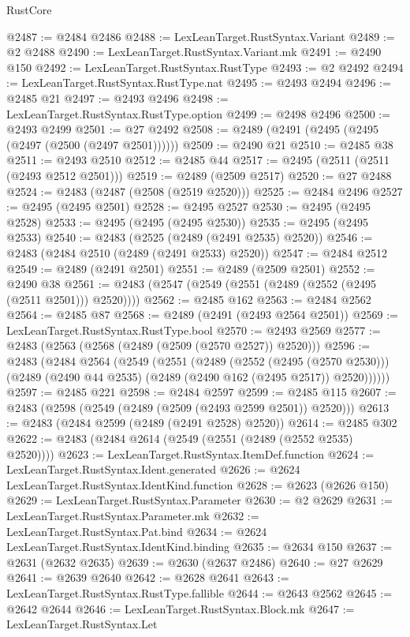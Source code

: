 \begin{lexlean}{RustCore}
\begin{coremodule}
@2487 := @2484 @2486
@2488 := LexLeanTarget.RustSyntax.Variant
@2489 := @2 @2488
@2490 := LexLeanTarget.RustSyntax.Variant.mk
@2491 := @2490 @150
@2492 := LexLeanTarget.RustSyntax.RustType
@2493 := @2 @2492
@2494 := LexLeanTarget.RustSyntax.RustType.nat
@2495 := @2493 @2494
@2496 := @2485 @21
@2497 := @2493 @2496
@2498 := LexLeanTarget.RustSyntax.RustType.option
@2499 := @2498 @2496
@2500 := @2493 @2499
@2501 := @27 @2492
@2508 := @2489 (@2491 (@2495 (@2495 (@2497 (@2500 (@2497 @2501))))))
@2509 := @2490 @21
@2510 := @2485 @38
@2511 := @2493 @2510
@2512 := @2485 @44
@2517 := @2495 (@2511 (@2511 (@2493 @2512 @2501)))
@2519 := @2489 (@2509 @2517)
@2520 := @27 @2488
@2524 := @2483 (@2487 (@2508 (@2519 @2520)))
@2525 := @2484 @2496
@2527 := @2495 (@2495 @2501)
@2528 := @2495 @2527
@2530 := @2495 (@2495 @2528)
@2533 := @2495 (@2495 (@2495 @2530))
@2535 := @2495 (@2495 @2533)
@2540 := @2483 (@2525 (@2489 (@2491 @2535) @2520))
@2546 := @2483 (@2484 @2510 (@2489 (@2491 @2533) @2520))
@2547 := @2484 @2512
@2549 := @2489 (@2491 @2501)
@2551 := @2489 (@2509 @2501)
@2552 := @2490 @38
@2561 := @2483 (@2547 (@2549 (@2551 (@2489 (@2552 (@2495 (@2511 @2501))) @2520))))
@2562 := @2485 @162
@2563 := @2484 @2562
@2564 := @2485 @87
@2568 := @2489 (@2491 (@2493 @2564 @2501))
@2569 := LexLeanTarget.RustSyntax.RustType.bool
@2570 := @2493 @2569
@2577 := @2483 (@2563 (@2568 (@2489 (@2509 (@2570 @2527)) @2520)))
@2596 := @2483
    (@2484
      @2564
      (@2549
        (@2551
          (@2489
            (@2552 (@2495 (@2570 @2530)))
            (@2489 (@2490 @44 @2535) (@2489 (@2490 @162 (@2495 @2517)) @2520))))))
@2597 := @2485 @221
@2598 := @2484 @2597
@2599 := @2485 @115
@2607 := @2483 (@2598 (@2549 (@2489 (@2509 (@2493 @2599 @2501)) @2520)))
@2613 := @2483 (@2484 @2599 (@2489 (@2491 @2528) @2520))
@2614 := @2485 @302
@2622 := @2483 (@2484 @2614 (@2549 (@2551 (@2489 (@2552 @2535) @2520))))
@2623 := LexLeanTarget.RustSyntax.ItemDef.function
@2624 := LexLeanTarget.RustSyntax.Ident.generated
@2626 := @2624 LexLeanTarget.RustSyntax.IdentKind.function
@2628 := @2623 (@2626 @150)
@2629 := LexLeanTarget.RustSyntax.Parameter
@2630 := @2 @2629
@2631 := LexLeanTarget.RustSyntax.Parameter.mk
@2632 := LexLeanTarget.RustSyntax.Pat.bind
@2634 := @2624 LexLeanTarget.RustSyntax.IdentKind.binding
@2635 := @2634 @150
@2637 := @2631 (@2632 @2635)
@2639 := @2630 (@2637 @2486)
@2640 := @27 @2629
@2641 := @2639 @2640
@2642 := @2628 @2641
@2643 := LexLeanTarget.RustSyntax.RustType.fallible
@2644 := @2643 @2562
@2645 := @2642 @2644
@2646 := LexLeanTarget.RustSyntax.Block.mk
@2647 := LexLeanTarget.RustSyntax.Let

\end{coremodule}
\end{lexlean}
